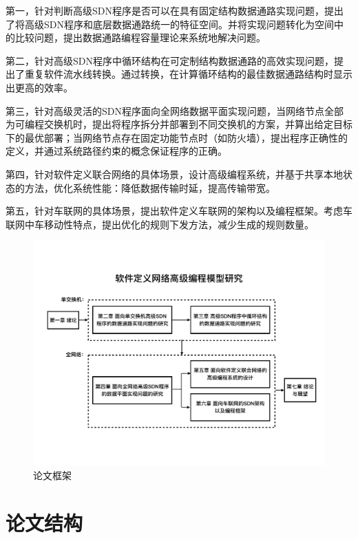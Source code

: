 第一，针对判断高级SDN程序是否可以在具有固定结构数据通路实现问题，提出了将高级SDN程序和底层数据通路统一的特征空间。并将实现问题转化为空间中的比较问题，提出数据通路编程容量理论来系统地解决问题。

第二，针对高级SDN程序中循环结构在可定制结构数据通路的高效实现问题，提出了重复软件流水线转换。通过转换，在计算循环结构的最佳数据通路结构时显示出更高的效率。

第三，针对高级灵活的SDN程序面向全网络数据平面实现问题，当网络节点全部为可编程交换机时，提出将程序拆分并部署到不同交换机的方案，并算出给定目标下的最优部署；当网络节点存在固定功能节点时（如防火墙），提出程序正确性的定义，并通过系统路径约束的概念保证程序的正确。

第四，针对软件定义联合网络的具体场景，设计高级编程系统，并基于共享本地状态的方法，优化系统性能：降低数据传输时延，提高传输带宽。

第五，针对车联网的具体场景，提出软件定义车联网的架构以及编程框架。考虑车联网中车移动性特点，提出优化的规则下发方法，减少生成的规则数量。

\begin{figure}[h!]
    \centering
    \vspace{-0.1in}
    \includegraphics[scale = 0.45]{figures/intro-fig1.pdf}
    \vspace{-0.1in}
    \caption{论文框架}
    \vspace{-0.1in}
    \label{intro:fig1}
\end{figure}


\section{论文结构}

